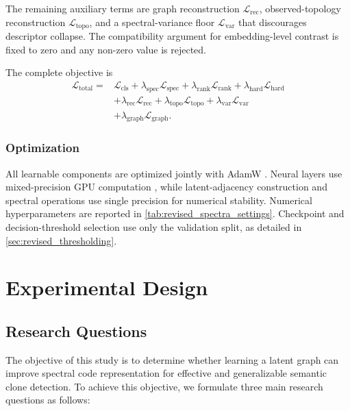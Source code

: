\documentclass[final,5p,times,twocolumn]{elsarticle}
\theoremstyle{plain}
\begin{document}
The remaining auxiliary terms are graph reconstruction $\mathcal{L}_{\mathrm{rec}}$, observed-topology reconstruction $\mathcal{L}_{\mathrm{topo}}$, and a spectral-variance floor $\mathcal{L}_{\mathrm{var}}$ that discourages descriptor collapse. The compatibility argument for embedding-level contrast is fixed to zero and any non-zero value is rejected.

The complete objective is
\begin{equation}
\begin{aligned}
\mathcal{L}_{\mathrm{total}}
={}&\mathcal{L}_{\mathrm{cls}}
+\lambda_{\mathrm{spec}}\mathcal{L}_{\mathrm{spec}}
+\lambda_{\mathrm{rank}}\mathcal{L}_{\mathrm{rank}}
+\lambda_{\mathrm{hard}}\mathcal{L}_{\mathrm{hard}}\\
&+\lambda_{\mathrm{rec}}\mathcal{L}_{\mathrm{rec}}
+\lambda_{\mathrm{topo}}\mathcal{L}_{\mathrm{topo}}
+\lambda_{\mathrm{var}}\mathcal{L}_{\mathrm{var}}\\
&+\lambda_{\mathrm{graph}}\mathcal{L}_{\mathrm{graph}}.
\end{aligned}
\label{eq:revised_complete_loss}
\end{equation}

\subsubsection{Optimization}
\label{sec:revised_optimization}

All learnable components are optimized jointly with AdamW \cite{loshchilov2017decoupled}. Neural layers use mixed-precision GPU computation \cite{micikevicius2018mixedprecision}, while latent-adjacency construction and spectral operations use single precision for numerical stability. Numerical hyperparameters are reported in \autoref{tab:revised_spectra_settings}. Checkpoint and decision-threshold selection use only the validation split, as detailed in \autoref{sec:revised_thresholding}.

\section{Experimental Design}
\label{sec:revised_experimental_design}

\subsection{Research Questions}
\label{sec:revised_research_questions}
The objective of this study is to determine whether learning a latent graph can improve spectral code representation for effective and generalizable semantic clone detection. To achieve this objective, we formulate three main research questions as follows:
\end{document}
